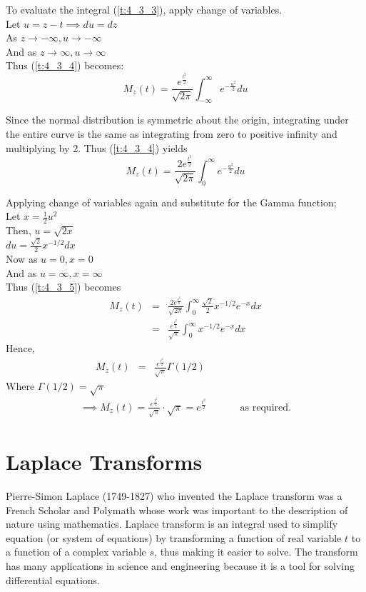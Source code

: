 \documentclass[11pt]{report}
\newcommand{\sps}{\\[0.2cm]}
\newcommand{\refn}[1]{(\ref{#1})}
\newcommand{\dsp}{\displaystyle}
\newcommand{\NI}{\noindent}
\begin{document}
	\NI To evaluate the integral \refn{t:4_3_3}, apply change of variables.\\
	Let $u=z-t \implies du = dz$\\
	As $z\rightarrow -\infty, u\rightarrow -\infty$\\
	And as $z\rightarrow\infty, u \to \infty$\\
	Thus \refn{t:4_3_4} becomes:
	\begin{equation}
		M_z(t) = \frac{e^{\frac{t^2}{2}}}{\sqrt{2\pi}}\int_{-\infty}^\infty e^{-\frac{u^2}{2}} du\tag{4}\label{t:4_3_4}
	\end{equation}
	
	\NI Since the normal distribution is symmetric about the origin, integrating under the entire curve is the same as integrating from zero to positive infinity and multiplying by 2. Thus \refn{t:4_3_4} yields
	\begin{equation}
		M_z(t) = \frac{2e^{\frac{t^2}{2}}}{\sqrt{2\pi}}\int_{0}^\infty e^{-\frac{u^2}{2}} du\tag{5}\label{t:4_3_5}
	\end{equation}
	
	\NI Applying change of variables again and substitute for the Gamma function;\\
	Let $x = \frac{1}{2}u^2$\\
	Then, $u=\sqrt{2x}$\\
	$du=\frac{\sqrt{2}}{2}x^{-1/2}dx$\\
	Now as $u=0, x = 0$\\
	And as $u=\infty, x = \infty$\\
	Thus \refn{t:4_3_5} becomes
	\begin{eqnarray*}
		M_z(t) &=& \frac{2e^{\frac{t^2}{2}}}{\sqrt{2\pi}}\int_{0}^\infty\frac{\sqrt{2}}{2}x^{-1/2}e^{-x}dx\sps
		&=&\frac{e^{\frac{t^2}{2}}}{\sqrt{\pi}}\int_{0}^\infty x^{-1/2}e^{-x}dx
	\end{eqnarray*}
	Hence,
	\begin{eqnarray*}
		M_z(t) &=& \frac{e^{\frac{t^2}{2}}}{\sqrt{\pi}}\Gamma(1/2)\qquad\qquad\qquad\quad
	\end{eqnarray*}
	Where $\dsp \Gamma(1/2) = \sqrt{\pi}$
	\begin{eqnarray*}
		\implies M_z(t) = \frac{e^{\frac{t^2}{2}}}{\sqrt{\pi}} \cdot \sqrt{\pi} = e^{\frac{t^2}{2}} \qquad\quad \text{ as required.}
	\end{eqnarray*}



	\section{Laplace Transforms}
	Pierre-Simon Laplace (1749-1827) who invented the Laplace transform was a French Scholar and Polymath whose work was important to the description of nature using mathematics. Laplace transform is an integral used to simplify equation (or system of equations) by transforming a function of real variable $t$ to a function of a complex variable $s$, thus making it easier to solve. The transform has many applications in science and engineering because it is a tool for solving differential equations.\\
	
\end{document}
